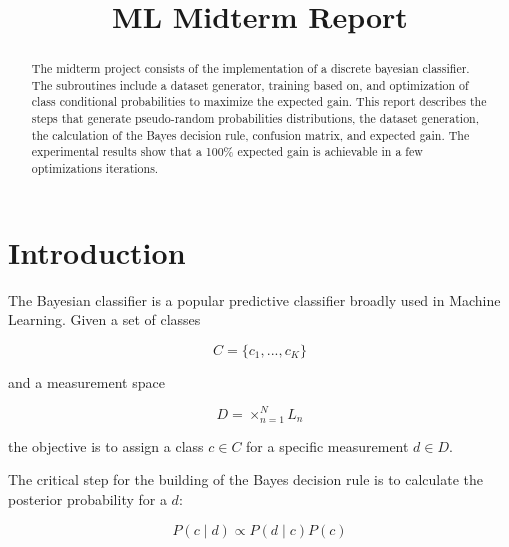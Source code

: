 \documentclass[letterpaper, conference]{IEEEtran}
\begin{document}
\title{ML Midterm Report}

\author{
}

\maketitle

\begin{abstract}

The midterm project consists of the implementation of a discrete bayesian classifier. The subroutines include a dataset generator, training based on, and optimization of class conditional probabilities to maximize the expected gain. This report describes the steps that generate pseudo-random probabilities distributions, the dataset generation, the calculation of the Bayes decision rule, confusion matrix, and expected gain. The experimental results show that a 100\% expected gain is achievable in a few optimizations iterations.

\end{abstract}

\section{Introduction}

The Bayesian classifier is a popular predictive classifier broadly used in Machine Learning. Given a set of classes

\begin{equation} \label{classes}
C = \{c_1, ..., c_K\}
\end{equation}

and a measurement space

\begin{equation} \label{dimensions}
D = \times_{n=1}^{N}L_n
\end{equation}

the objective is to assign a class $c \in C$ for a specific measurement $d \in D$.

The critical step for the building of the Bayes decision rule is to calculate the posterior probability for a $d$:

\begin{equation} \label{eq:bayes}
P(c \mid d) \propto P(d \mid c) P(c)
\end{equation}
\end{document}
